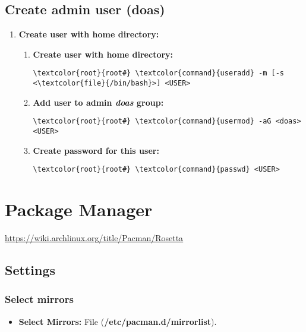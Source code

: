 \documentclass[10pt, a4paper, onecolumn, openany]{book} %
\begin{document}
\section{Create admin user (doas)}
\begin{enumerate}
    \item \textbf{Create user with home directory:}
    \begin{enumerate}
        \item \textbf{Create user with home directory:}
\begin{Verbatim}[commandchars=\\\{\}]
\textcolor{root}{root#} \textcolor{command}{useradd} -m [-s <\textcolor{file}{/bin/bash}>] <USER>
\end{Verbatim}
        \item \textbf{Add user to admin \textit{doas} group:}
\begin{Verbatim}[commandchars=\\\{\}]
\textcolor{root}{root#} \textcolor{command}{usermod} -aG <doas> <USER>
\end{Verbatim}
        \item \textbf{Create password for this user:}
\begin{Verbatim}[commandchars=\\\{\}]
\textcolor{root}{root#} \textcolor{command}{passwd} <USER>
\end{Verbatim}
    \end{enumerate}
\end{enumerate}
\chapter{Package Manager}
\underline{\href{https://wiki.archlinux.org/title/Pacman/Rosetta}{https://wiki.archlinux.org/title/Pacman/Rosetta}}
\section{Settings}
\subsection{Select mirrors}
\begin{itemize}
    \item \textbf{Select Mirrors:}
\newline File (\textbf{\textcolor{file}{/etc/pacman.d/mirrorlist}}).
\end{itemize}
\end{document}
